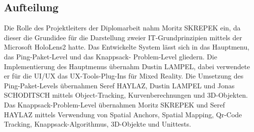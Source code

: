 \subsection{Aufteilung}
Die Rolle des Projektleiters der Diplomarbeit nahm Moritz SKREPEK ein, da dieser die
Grundidee für die Darstellung zweier IT-Grundprinzipien mittels der Microsoft HoloLens2
hatte.
Das Entwickelte System lässt sich in das Hauptmenu, das Ping-Paket-Level und das Knappsack-
Problem-Level gliedern. Die Implementierung des Hauptmenus übernahm Dustin LAMPEL, dabei
verwendete er für die UI/UX das UX-Tools-Plug-Ins für Mixed Reality. Die Umsetzung des
Ping-Paket-Levels übernahmen Seref HAYLAZ, Dustin LAMPEL und Jonas SCHODITSCH mittels
Object-Tracking, Kurvenberechnungen und 3D-Objekten. Das Knappsack-Problem-Level übernahmen
Moritz SKREPEK und Seref HAYLAZ mittels Verwendung von Spatial Anchors, Spatial Mapping, Qr-Code
Tracking, Knappsack-Algorithmus, 3D-Objekte und Unittests.
